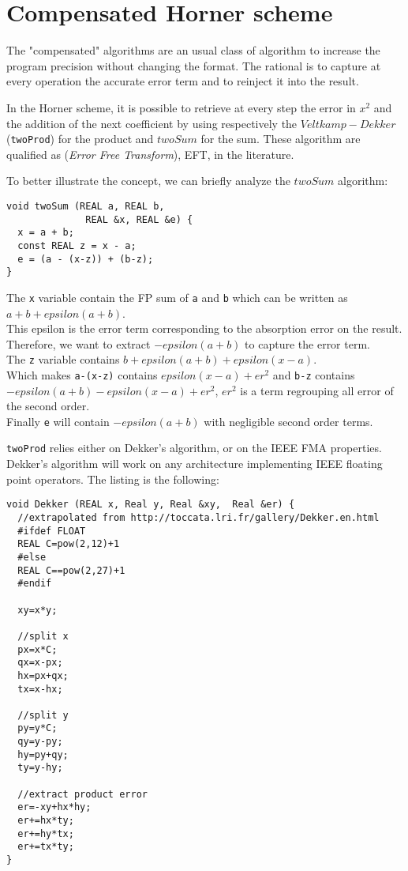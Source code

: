 \section{Compensated Horner scheme}

The "compensated" algorithms are an usual class of algorithm to increase the
program precision without changing the format. The rational is to capture at
every operation the accurate error term and to reinject it into the result.

In the Horner scheme, it is possible to retrieve at every step the error in
$x^2$ and the addition of the next coefficient by using respectively the
$Veltkamp-Dekker$ ({\tt twoProd}) for the product and $twoSum$ for the sum.
These algorithm are qualified as ({\it Error Free Transform}), EFT, in the
literature.

To better illustrate the concept, we can briefly analyze the $twoSum$ algorithm:
\begin{lstlisting}[frame=single, style=customC]
void twoSum (REAL a, REAL b,
              REAL &x, REAL &e) {
  x = a + b;
  const REAL z = x - a;
  e = (a - (x-z)) + (b-z);
}
\end{lstlisting}

The {\tt x} variable contain the FP sum of  {\tt a}  and  {\tt b} which can be written as $a+b+epsilon(a+b)$. \\
This epsilon is the error term corresponding to the absorption error on the result. \\
Therefore, we want to extract $ -epsilon(a+b)$ to capture the error term.  \\
The {\tt z} variable contains $b + epsilon(a+b)+epsilon(x-a)$. \\
Which makes {\tt a-(x-z)} contains $epsilon(x-a)+er^2$ and {\tt b-z} contains $-epsilon(a+b)-epsilon(x-a)+er^2$, $er^2$ is a term regrouping all error of the second order. \\
Finally {\tt e} will contain $-epsilon(a+b)$ with negligible second order terms.


{\tt twoProd} relies either on Dekker's algorithm, or on the IEEE FMA properties.
Dekker's algorithm will work on any architecture implementing IEEE floating point operators.
The listing is the following:
\begin{lstlisting}[frame=single, style=customC]
void Dekker (REAL x, Real y, Real &xy,  Real &er) {
  //extrapolated from http://toccata.lri.fr/gallery/Dekker.en.html
  #ifdef FLOAT
  REAL C=pow(2,12)+1
  #else
  REAL C==pow(2,27)+1
  #endif

  xy=x*y;

  //split x
  px=x*C;
  qx=x-px;
  hx=px+qx;
  tx=x-hx;

  //split y
  py=y*C;
  qy=y-py;
  hy=py+qy;
  ty=y-hy;

  //extract product error
  er=-xy+hx*hy;
  er+=hx*ty;
  er+=hy*tx;
  er+=tx*ty;
}
\end{lstlisting}

